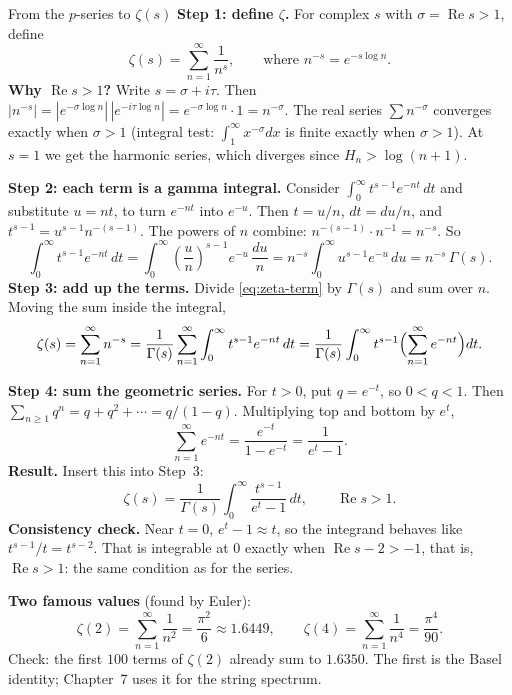 \documentclass[11pt]{beamer}
\begin{document}
\begin{frame}[allowframebreaks=1.00]{From the \(p\)-series to \(\zeta(s)\)}
\textbf{Step 1: define \(\zeta\).} For complex \(s\) with \(\sigma=\operatorname{Re}s>1\), define
\begin{equation}
  \zeta(s)=\sum_{n=1}^{\infty}\frac1{n^s},
  \qquad\text{where } n^{-s}=e^{-s\log n}.
  \label{eq:zeta-series}
\end{equation}
\textbf{Why \(\operatorname{Re}s>1\)?} Write \(s=\sigma+i\tau\). Then
\(|n^{-s}|=|e^{-\sigma\log n}|\,|e^{-i\tau\log n}|=e^{-\sigma\log n}\cdot1=n^{-\sigma}\). The real series
\(\sum n^{-\sigma}\) converges exactly when \(\sigma>1\) (integral test:
\(\int_1^\infty x^{-\sigma}dx\) is finite exactly when \(\sigma>1\)). At \(s=1\) we get the harmonic
series, which diverges since \(H_n>\log(n+1)\).
\par\framebreak\par
\textbf{Step 2: each term is a gamma integral.} Consider \(\int_0^\infty t^{s-1}e^{-nt}\,dt\) and
substitute \(u=nt\), to turn \(e^{-nt}\) into \(e^{-u}\). Then \(t=u/n\), \(dt=du/n\), and
\(t^{s-1}=u^{s-1}n^{-(s-1)}\). The powers of \(n\) combine: \(n^{-(s-1)}\cdot n^{-1}=n^{-s}\). So
\begin{equation}
  \int_0^\infty t^{s-1}e^{-nt}\,dt
   =\int_0^\infty
     \left(\frac{u}{n}\right)^{s-1}
     e^{-u}\,\frac{du}{n}
   =n^{-s}\int_0^\infty u^{s-1}e^{-u}\,du
   =n^{-s}\,\Gamma(s).
  \label{eq:zeta-term}
\end{equation}
\textbf{Step 3: add up the terms.} Divide \eqref{eq:zeta-term} by \(\Gamma(s)\) and sum over \(n\).
Moving the sum inside the integral,
\[
  \zeta(s)=\sum_{n=1}^{\infty}n^{-s}
  =\frac1{\Gamma(s)}\sum_{n=1}^{\infty}\int_0^\infty t^{s-1}e^{-nt}\,dt
  =\frac1{\Gamma(s)}\int_0^\infty t^{s-1}\Bigl(\sum_{n=1}^{\infty}e^{-nt}\Bigr)dt .
\]
\par\framebreak\par
\textbf{Step 4: sum the geometric series.} For \(t>0\), put \(q=e^{-t}\), so \(0<q<1\). Then
\(\sum_{n\ge1}q^n=q+q^2+\cdots=q/(1-q)\). Multiplying top and bottom by \(e^t\),
\[
  \sum_{n=1}^{\infty}e^{-nt}
   =\frac{e^{-t}}{1-e^{-t}}
   =\frac1{e^t-1}.
\]
\textbf{Result.} Insert this into Step~3:
\begin{equation}
  \zeta(s)
   =\frac1{\Gamma(s)}
     \int_0^\infty\frac{t^{s-1}}{e^t-1}\,dt,
  \qquad \operatorname{Re}s>1.
  \label{eq:zeta-int}
\end{equation}
\textbf{Consistency check.} Near \(t=0\), \(e^t-1\approx t\), so the integrand behaves like
\(t^{s-1}/t=t^{s-2}\). That is integrable at \(0\) exactly when \(\operatorname{Re}s-2>-1\), that is,
\(\operatorname{Re}s>1\): the same condition as for the series.
\par\framebreak\par
\textbf{Two famous values} (found by Euler):
\[
  \zeta(2)=\sum_{n=1}^{\infty}\frac1{n^2}=\frac{\pi^2}{6}\approx1.6449,\qquad
  \zeta(4)=\sum_{n=1}^{\infty}\frac1{n^4}=\frac{\pi^4}{90}.
\]
Check: the first \(100\) terms of \(\zeta(2)\) already sum to \(1.6350\). The first is the Basel
identity; Chapter~7 uses it for the string spectrum.


\end{frame}
\end{document}
